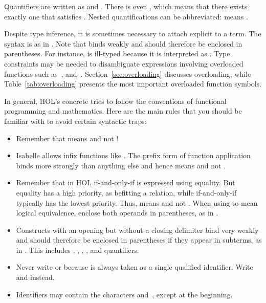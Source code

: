 Quantifiers are written as
 and . 
There is even
, which
means that there exists exactly one  that satisfies . 
Nested quantifications can be abbreviated:
 means
.%

Despite type inference, it is sometimes necessary to attach explicit
 to a term.  The syntax is
 as in . Note that
 binds weakly and should therefore be enclosed
in parentheses.  For instance,
 is ill-typed because it is interpreted as
.  Type constraints may be needed to disambiguate
expressions
involving overloaded functions such as~\isa{+}, 
\isa{*} and~\isa{<}.  Section~\ref{sec:overloading} 
discusses overloading, while Table~\ref{tab:overloading} presents the most
important overloaded function symbols.

In general, HOL's concrete  tries to follow the conventions of
functional programming and mathematics.  Here are the main rules that you
should be familiar with to avoid certain syntactic traps:
\begin{itemize}
\item
Remember that  means  and not !
\item
Isabelle allows infix functions like \isa{+}. The prefix form of function
application binds more strongly than anything else and hence 
means  and not .
\item Remember that in HOL if-and-only-if is expressed using equality.  But
  equality has a high priority, as befitting a relation, while if-and-only-if
  typically has the lowest priority.  Thus,  means  and not
  . When using \isa{=} to mean
  logical equivalence, enclose both operands in parentheses, as in .
\item
Constructs with an opening but without a closing delimiter bind very weakly
and should therefore be enclosed in parentheses if they appear in subterms, as
in .  This includes 
,
,
,
\isa{\isasymlambda}, and quantifiers.
\item
Never write  or 
because  is always taken as a single qualified identifier. Write
 and  instead.
\item Identifiers may contain the characters \isa{_} 
and~, except at the beginning.
\end{itemize}

